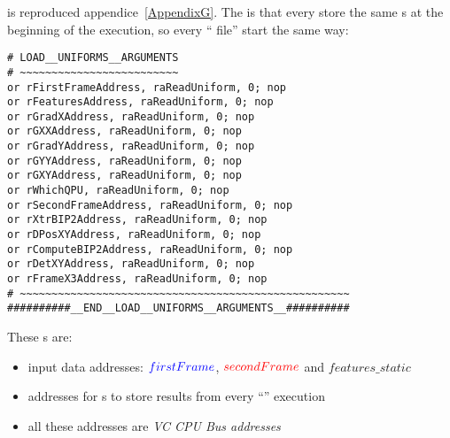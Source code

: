  is reproduced appendice~\ref{AppendixG}. The  is that every \qpu{} store the same \uni{}s at the beginning of the execution, so every \enquote{ file} start the same way:
\newpage

\begin{lstlisting}
# LOAD__UNIFORMS__ARGUMENTS
# ~~~~~~~~~~~~~~~~~~~~~~~~~
or rFirstFrameAddress, raReadUniform, 0; nop
or rFeaturesAddress, raReadUniform, 0; nop
or rGradXAddress, raReadUniform, 0; nop
or rGXXAddress, raReadUniform, 0; nop
or rGradYAddress, raReadUniform, 0; nop
or rGYYAddress, raReadUniform, 0; nop
or rGXYAddress, raReadUniform, 0; nop
or rWhichQPU, raReadUniform, 0; nop
or rSecondFrameAddress, raReadUniform, 0; nop
or rXtrBIP2Address, raReadUniform, 0; nop
or rDPosXYAddress, raReadUniform, 0; nop
or rComputeBIP2Address, raReadUniform, 0; nop
or rDetXYAddress, raReadUniform, 0; nop
or rFrameX3Address, raReadUniform, 0; nop
# ~~~~~~~~~~~~~~~~~~~~~~~~~~~~~~~~~~~~~~~~~~~~~~~~~~~~
##########__END__LOAD__UNIFORMS__ARGUMENTS__##########
\end{lstlisting}

These \uni{}s are:
\begin{itemize}
	\item input data addresses: $\textcolor{blue}{firstFrame}$, $\textcolor{red}{secondFrame}$ and $features\_static$
	\item addresses for \qpu{}s to store results from every \enquote{} execution
	\item all these addresses are \emph{VC CPU Bus addresses}
\end{itemize}

